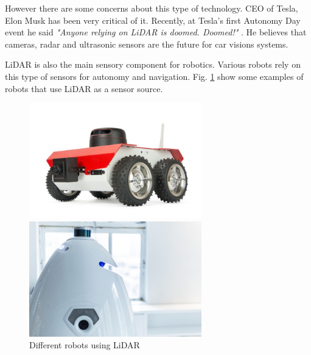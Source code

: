 However there are some concerns about this type of technology. CEO of Tesla, Elon Musk has been very critical of it. Recently, at Tesla’s first Autonomy Day event  he said \textit{"Anyone relying on \ac{LiDAR} is doomed. Doomed!"} \cite{elon}. He believes that cameras, radar and ultrasonic sensors are the future for car visions systems. 

\ac{LiDAR} is also the main sensory component for robotics. Various robots rely on this type of sensors for autonomy and navigation. Fig. \ref{fig:robotslidar} show some examples of robots that use \ac{LiDAR} as a sensor source.
\begin{figure}[h] 
    \begin{minipage}[b]{.49\linewidth}
        \includegraphics[height=5cm,width=\linewidth]{imgs/chapter2/robot1.jpg}
    \end{minipage}
    \begin{minipage}[b]{.49\linewidth}
        \includegraphics[height=5cm,width=\linewidth]{imgs/chapter2/robot2.jpg}
    \end{minipage}
    \caption{Different robots using \ac{LiDAR}}
    \label{fig:robotslidar}
\end{figure}




